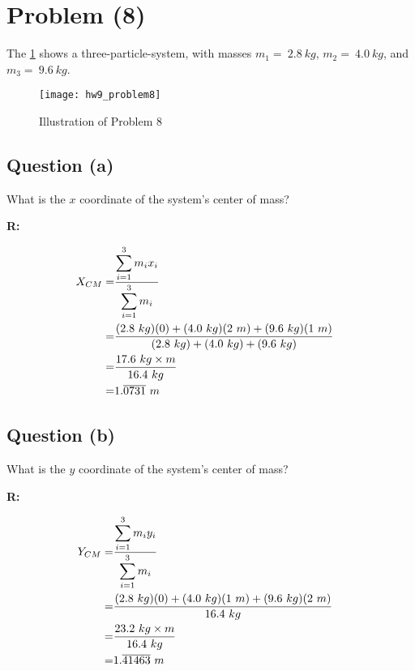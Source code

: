 \section{Problem (8)}
	The \cref{fig:hw9_problem8} shows a three-particle-system, with masses $m_{1} = \ 2.8 \ kg$, $m_{2} = \ 4.0 \ kg$, and $m_{3} = \ 9.6 \ kg$.

	\begin{figure}[H]
		\begin{center}
			\texttt{[image: hw9\_problem8]}
			\caption{Illustration of Problem 8}
			\label{fig:hw9_problem8}
		\end{center}
	\end{figure}

	\subsection{Question (a)}

		What is the $x$ coordinate of the system's center of mass?

		\textbf{R:}

		\begin{align}
			X_{CM} = &\frac{\displaystyle\sum_{i=1}^{3} m_i x_{i}}{\displaystyle\sum_{i=1}^{3} m_i}& \notag \\
			= &\frac{(2.8 \ kg)(0) + (4.0 \ kg)(2 \ m) + (9.6 \ kg)(1 \ m)}{(2.8 \ kg) + (4.0 \ kg) + (9.6 \ kg)}& \notag \\
			= &\frac{17.6 \ kg \times m}{16.4 \ kg}& \notag \\
			= &1.\overline{0731} \ m&
		\end{align}

	\subsection{Question (b)}

		What is the $y$ coordinate of the system's center of mass?

		\textbf{R:}

		\begin{align}
			Y_{CM} = &\frac{\displaystyle\sum_{i=1}^{3} m_i y_{i}}{\displaystyle\sum_{i=1}^{3} m_i}& \notag \\
			= &\frac{(2.8 \ kg)(0) + (4.0 \ kg)(1 \ m) + (9.6 \ kg)(2 \ m)}{16.4 \ kg}& \notag \\
			= &\frac{23.2 \ kg \times m}{16.4 \ kg}& \notag \\
			= &1.\overline{41463} \ m&
		\end{align}
